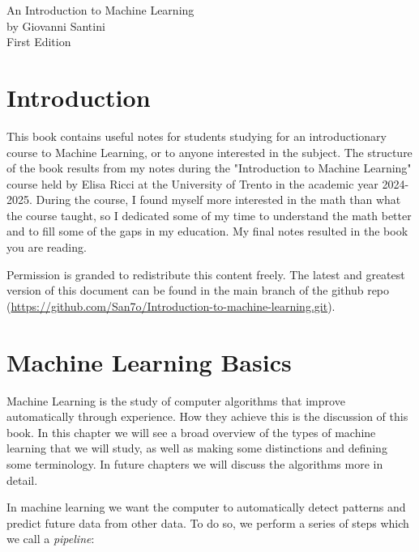 \documentclass[11pt]{article}
\title{}
\begin{document}
\begin{titlepage}
  \centering
  {\Huge An Introduction to Machine Learning \\}
  \vspace*{50.0pt}
  by Giovanni Santini \\
  \vspace{1.5pt}
  First Edition
\end{titlepage}
\providecommand{\tightlist}{%
  \setlength{\itemsep}{0pt}\setlength{\parskip}{0pt}}

\tableofcontents

\newpage

\section*{Introduction}

This book contains useful notes for students studying for an
introductionary course to Machine Learning, or to anyone interested in
the subject. The structure of the book results from my notes during
the "Introduction to Machine Learning" course held by Elisa Ricci at
the University of Trento in the academic year 2024-2025. During the
course, I found myself more interested in the math than what the
course taught, so I dedicated some of my time to understand the math
better and to fill some of the gaps in my education. My final notes
resulted in the book you are reading.

Permission is granded to redistribute this content freely. The latest
and greatest version of this document can be found in the main branch
of the github repo
(\href{https://github.com/San7o/Introduction-to-machine-learning.git}{https://github.com/San7o/Introduction-to-machine-learning.git}).

\newpage


\section{Machine Learning Basics}\label{machine-learning-basics}

Machine Learning is the study of computer algorithms that improve
automatically through experience. How they achieve this is the
discussion of this book. In this chapter we will see a broad overview of
the types of machine learning that we will study, as well as making some
distinctions and defining some terminology. In future chapters we will
discuss the algorithms more in detail.

In machine learning we want the computer to automatically detect
patterns and predict future data from other data. To do so, we perform a
series of steps which we call a \emph{pipeline}:
\end{document}
